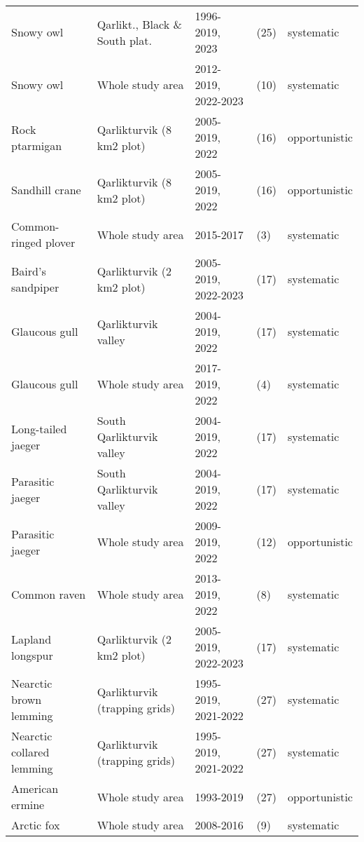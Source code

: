 \begin{table}[ht]
\begin{tabularx}{\textwidth}{lllll}
  Snowy owl & Qarlikt., Black \& South plat. & 1996-2019, 2023 & (25) & systematic \\ 
  Snowy owl & Whole study area & 2012-2019, 2022-2023 & (10) & systematic \\ 
  Rock ptarmigan & Qarlikturvik (8 km2 plot) & 2005-2019, 2022 & (16) & opportunistic \\ 
  Sandhill crane & Qarlikturvik (8 km2 plot) & 2005-2019, 2022 & (16) & opportunistic \\ 
  Common-ringed plover & Whole study area & 2015-2017 & (3) & systematic \\ 
  Baird's sandpiper & Qarlikturvik (2 km2 plot) & 2005-2019, 2022-2023 & (17) & systematic \\ 
  Glaucous gull & Qarlikturvik valley & 2004-2019, 2022 & (17) & systematic \\ 
  Glaucous gull & Whole study area & 2017-2019, 2022 & (4) & systematic \\ 
  Long-tailed jaeger & South Qarlikturvik valley & 2004-2019, 2022 & (17) & systematic \\ 
  Parasitic jaeger & South Qarlikturvik valley & 2004-2019, 2022 & (17) & systematic \\ 
  Parasitic jaeger & Whole study area & 2009-2019, 2022 & (12) & opportunistic \\ 
  Common raven & Whole study area & 2013-2019, 2022 & (8) & systematic \\ 
  Lapland longspur & Qarlikturvik (2 km2 plot) & 2005-2019, 2022-2023 & (17) & systematic \\ 
  Nearctic brown lemming & Qarlikturvik (trapping grids) & 1995-2019, 2021-2022 & (27) & systematic \\ 
  Nearctic collared lemming & Qarlikturvik (trapping grids) & 1995-2019, 2021-2022 & (27) & systematic \\ 
  American ermine & Whole study area & 1993-2019 & (27) & opportunistic \\ 
  Arctic fox & Whole study area & 2008-2016 & (9) & systematic \\ 
   \hline
\end{tabularx}
\endgroup
\end{table}
